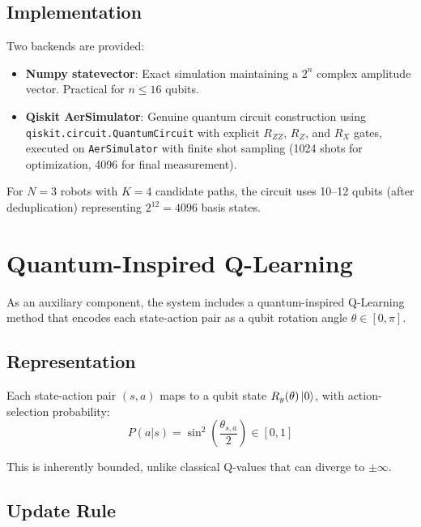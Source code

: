 \documentclass[conference]{IEEEtran}
\begin{document}
\subsection{Implementation}

Two backends are provided:
\begin{itemize}
    \item \textbf{Numpy statevector}: Exact simulation maintaining a $2^n$ complex amplitude vector. Practical for $n \leq 16$ qubits.
    \item \textbf{Qiskit AerSimulator}: Genuine quantum circuit construction using \texttt{qiskit.circuit.QuantumCircuit} with explicit $R_{ZZ}$, $R_Z$, and $R_X$ gates, executed on \texttt{AerSimulator} with finite shot sampling (1024 shots for optimization, 4096 for final measurement).
\end{itemize}

For $N = 3$ robots with $K = 4$ candidate paths, the circuit uses 10--12 qubits (after deduplication) representing $2^{12} = 4096$ basis states.

\section{Quantum-Inspired Q-Learning}
\label{sec:quantum_ql}

As an auxiliary component, the system includes a quantum-inspired Q-Learning method that encodes each state-action pair as a qubit rotation angle $\theta \in [0, \pi]$.

\subsection{Representation}

Each state-action pair $(s,a)$ maps to a qubit state $R_y(\theta)\ket{0}$, with action-selection probability:
\begin{equation}
    P(a|s) = \sin^2\!\left(\frac{\theta_{s,a}}{2}\right) \in [0, 1]
\end{equation}

This is inherently bounded, unlike classical Q-values that can diverge to $\pm\infty$.

\subsection{Update Rule}
\end{document}
